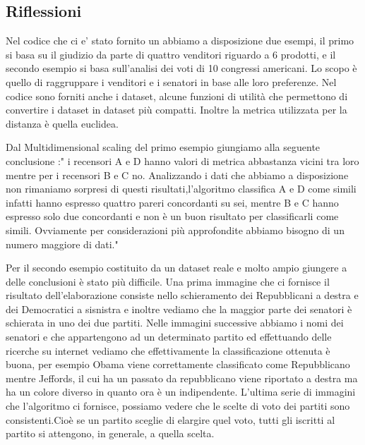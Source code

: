 			\subsection{Riflessioni }		
				Nel codice che ci e' stato fornito un abbiamo a disposizione due esempi, il primo si basa su il giudizio da parte di quattro venditori riguardo a 6 prodotti, e il secondo esempio si basa sull'analisi dei voti di 10 congressi americani.
				Lo scopo è quello di raggruppare i venditori e i senatori in base alle loro preferenze.
				Nel codice sono forniti anche i dataset, alcune funzioni di utilità che permettono di convertire i dataset in dataset più compatti.
				Inoltre la metrica utilizzata per la distanza è quella euclidea.
				
				Dal Multidimensional scaling del primo esempio giungiamo alla seguente conclusione :" i recensori A e D hanno valori di metrica abbastanza vicini tra loro mentre per i recensori B e C no.
				Analizzando i dati che abbiamo a disposizione non rimaniamo sorpresi di questi risultati,l'algoritmo classifica A e D come simili infatti hanno espresso quattro pareri concordanti su sei, mentre B e C hanno espresso solo due concordanti e non è un buon risultato per classificarli come simili.
				Ovviamente per considerazioni più approfondite abbiamo bisogno di un numero maggiore di dati."
				
				Per il secondo esempio costituito da un dataset reale e molto ampio giungere a delle conclusioni è stato più difficile.
				Una prima immagine che ci fornisce il risultato dell'elaborazione consiste nello schieramento dei Repubblicani a destra e dei Democratici a sisnistra e inoltre vediamo che la maggior parte dei
				 senatori è schierata in uno dei due partiti.
				Nelle immagini successive abbiamo i nomi dei senatori e che appartengono ad un determinato partito ed effettuando delle ricerche su internet vediamo che effettivamente la classificazione ottenuta è buona, per esempio Obama viene correttamente classificato come Repubblicano mentre Jeffords, il cui ha un passato da repubblicano viene riportato a destra ma ha un colore diverso in quanto ora è un indipendente.
				L'ultima serie di immagini che l'algoritmo ci fornisce, possiamo vedere che le scelte di voto dei partiti sono consistenti.Cioè se un partito sceglie di elargire quel voto, tutti gli iscritti al partito si attengono, in generale, a quella scelta.
